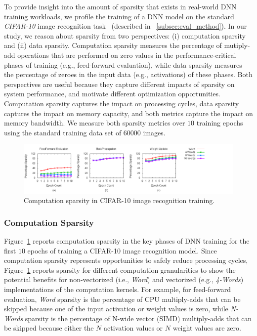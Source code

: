 To provide insight into the amount of sparsity that exists in real-world DNN training workloads, we profile the training of a DNN model on the standard {\it CIFAR-10} image recognition task~\cite{KrizhevskyThesis} (described in ~\ref{subsec:eval_method}).  In our study, we reason about sparsity from two perspectives: (i) computation sparsity and (ii)  data sparsity.  Computation sparsity measures the percentage of mutiply-add operations that are performed on zero values in the performance-critical phases of training (e.g., feed-forward evaluation), while data sparsity measures the percentage of zeroes in the input data (e.g., activations) of these phases.  Both perspectives are useful because they capture different impacts of sparsity on system performance, and motivate different optimization opportunities.  Computation sparsity captures the impact on processing cycles, data sparsity captures the impact on memory capacity, and both metrics capture the impact on memory bandwidth.  We measure both sparsity metrics over $10$ training epochs using the standard training data set of $60000$ images. 

\begin{figure}
 \centering
 \includegraphics[width=1.9\columnwidth]{Figures/multi_computesparsity.png}
\caption{Computation sparsity in CIFAR-10 image recognition training.}
 \label{fig:cifar-10_compute_sparsity}
 \end{figure}
 
\subsubsection{Computation Sparsity}
 Figure~\ref{fig:cifar-10_compute_sparsity} reports computation sparsity in the key phases of DNN training for the first $10$ epochs of training a CIFAR-10 image recognition model.  Since computation sparsity represents opportunities to safely reduce processing cycles, Figure~\ref{fig:cifar-10_compute_sparsity} reports sparsity for different computation granularities to show the potential benefits for non-vectorized (i.e., {\it Word}) and vectorized (e.g., {\it 4-Words}) implementations of the computation kernels.  For example, for feed-forward evaluation, {\it Word} sparsity is the percentage of CPU multiply-adds that can be skipped because one of the input activation or weight values is zero, while {\it N-Words} sparsity is the percentage of N-wide vector (SIMD) multiply-adds that can be skipped because either the $N$ activation values or $N$ weight values are zero. 
 
